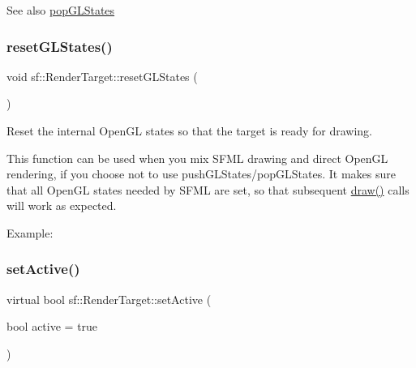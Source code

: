 \begin{DoxySeeAlso}{See also}
\mbox{\hyperlink{classsf_1_1_render_target_ad5a98401113df931ddcd54c080f7aa8e}{pop\+G\+L\+States}} \begin{DoxyVerb}\end{DoxyVerb}
 
\end{DoxySeeAlso}
\mbox{\label{classsf_1_1_render_target_aac7504990d27dada4bfe3c7866920765}} 
\subsubsection{\texorpdfstring{resetGLStates()}{resetGLStates()}}
{\footnotesize\ttfamily void sf\+::\+Render\+Target\+::reset\+G\+L\+States (\begin{DoxyParamCaption}{ }\end{DoxyParamCaption})}



Reset the internal Open\+GL states so that the target is ready for drawing. 

This function can be used when you mix S\+F\+ML drawing and direct Open\+GL rendering, if you choose not to use push\+G\+L\+States/pop\+G\+L\+States. It makes sure that all Open\+GL states needed by S\+F\+ML are set, so that subsequent \mbox{\hyperlink{classsf_1_1_render_target_a12417a3bcc245c41d957b29583556f39}{draw()}} calls will work as expected.

Example\+: 
\begin{DoxyCode}{0}
\DoxyCodeLine{\textcolor{comment}{// OpenGL code here...}}
\DoxyCodeLine{\textcolor{comment}{// OpenGL code here...}}
\end{DoxyCode}
 \begin{DoxyVerb}\end{DoxyVerb}
 \mbox{\label{classsf_1_1_render_target_adc225ead22a70843ffa9b7eebefa0ce1}} 
\subsubsection{\texorpdfstring{setActive()}{setActive()}}
{\footnotesize\ttfamily virtual bool sf\+::\+Render\+Target\+::set\+Active (\begin{DoxyParamCaption}\item[{bool}]{active = {\ttfamily true} }\end{DoxyParamCaption})\hspace{0.3cm}{\ttfamily [virtual]}}



